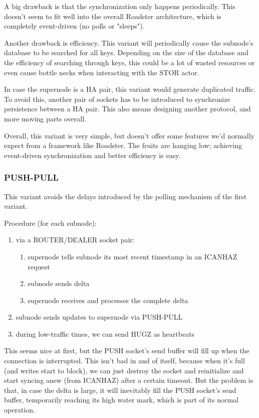 A big drawback is that the synchronization only happens periodically. This
doesn't seem to fit well into the overall Roadster architecture, which is
completely event-driven (no polls or "sleeps").

Another drawback is efficiency. This variant will periodically cause the
subnode's database to be searched for all keys. Depending on the size of the
database and the efficiency of searching through keys, this could be a lot of
wasted resources or even cause bottle necks when interacting with the STOR
actor.

In case the supernode is a HA pair, this variant would generate duplicated
traffic. To avoid this, another pair of sockets has to be introduced to
synchronize persistence between a HA pair. This also means designing another
protocol, and more moving parts overall.


Overall, this variant is very simple, but doesn't offer some features we'd
normally expect from a framework like Roadster. The fruits are hanging low;
achieving event-driven synchronization and better efficiency is easy.

\subsubsection{PUSH-PULL}
This variant avoids the delays introduced by the polling mechanism of the first variant.

Procedure (for each subnode):
\begin{enumerate}
	\item via a ROUTER/DEALER socket pair:
		\begin{enumerate}
			\item supernode tells subnode its most recent timestamp in an ICANHAZ request
			\item subnode sends delta
			\item supernode receives and processes the complete delta
		\end{enumerate}
	\item subnode sends updates to supernode via PUSH-PULL
	\item during low-traffic times, we can send HUGZ as heartbeats
\end{enumerate}

This seems nice at first, but the PUSH socket's send buffer will fill up when the
connection is interrupted.  This isn't bad in and of itself, because when it's
full (and writes start to block), we can just destroy the socket and
reinitialize and start syncing anew (from ICANHAZ) after a certain timeout.
But the problem is that, in case the delta is large, it will inevitably fill
the PUSH socket's send buffer, temporarily reaching its high water mark, which
is part of its normal operation.

